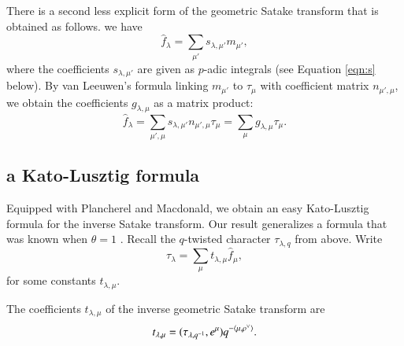 There is a second less explicit form of the geometric Satake transform that is obtained as follows.
we have
\[
\hat f_\lambda = \sum_{\mu'} s_{\lambda,\mu'} m_{\mu'},
\]
where the coefficients $s_{\lambda,\mu'}$ are given as $p$-adic integrals (see Equation \ref{eqn:s} below).
By van Leeuwen's formula linking $m_{\mu'}$ to $\tau_\mu$ with coefficient matrix $n_{\mu',\mu}$, 
we obtain the coefficients $g_{\lambda,\mu}$ as a matrix product:
\begin{equation}
\hat f_\lambda = \sum_{\mu',\mu} s_{\lambda,\mu'} n_{\mu',\mu} \tau_{\mu} = \sum_{\mu} g_{\lambda,\mu} \tau_\mu.
\end{equation}

\subsection{a Kato-Lusztig formula}

Equipped with Plancherel and Macdonald, we obtain an easy Kato-Lusztig formula for the inverse Satake transform.
Our result generalizes a formula that was
 known when $\theta=1$ \cite{kato1982spherical} \cite{lusztig1983singularities}.
Recall the $q$-twisted character  $\tau_{\lambda,q}$ from above.
Write 
\[
\tau_\lambda = \sum_\mu t_{\lambda,\mu}  \hat f_\mu,
\]
for some constants $t_{\lambda,\mu}$.

\begin{theorem}
The coefficients $t_{\lambda,\mu}$ of the inverse geometric Satake transform are 
\[
t_{\lambda,\mu} =  (\tau_{\lambda,q^{-1}},e^\mu) q^{-\langle{\mu,\rho^\vee}\rangle}.
\]
\end{theorem}

